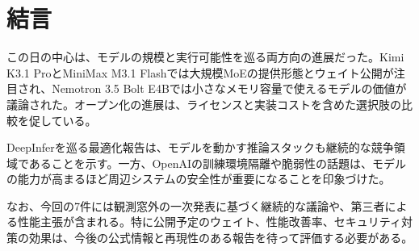 \section*{結言}
この日の中心は、モデルの規模と実行可能性を巡る両方向の進展だった。Kimi K3.1 ProとMiniMax M3.1 Flashでは大規模MoEの提供形態とウェイト公開が注目され、Nemotron 3.5 Bolt E4Bでは小さなメモリ容量で使えるモデルの価値が議論された。オープン化の進展は、ライセンスと実装コストを含めた選択肢の比較を促している。

DeepInferを巡る最適化報告は、モデルを動かす推論スタックも継続的な競争領域であることを示す。一方、OpenAIの訓練環境隔離や脆弱性の話題は、モデルの能力が高まるほど周辺システムの安全性が重要になることを印象づけた。

なお、今回の7件には観測窓外の一次発表に基づく継続的な議論や、第三者による性能主張が含まれる。特に公開予定のウェイト、性能改善率、セキュリティ対策の効果は、今後の公式情報と再現性のある報告を待って評価する必要がある。
